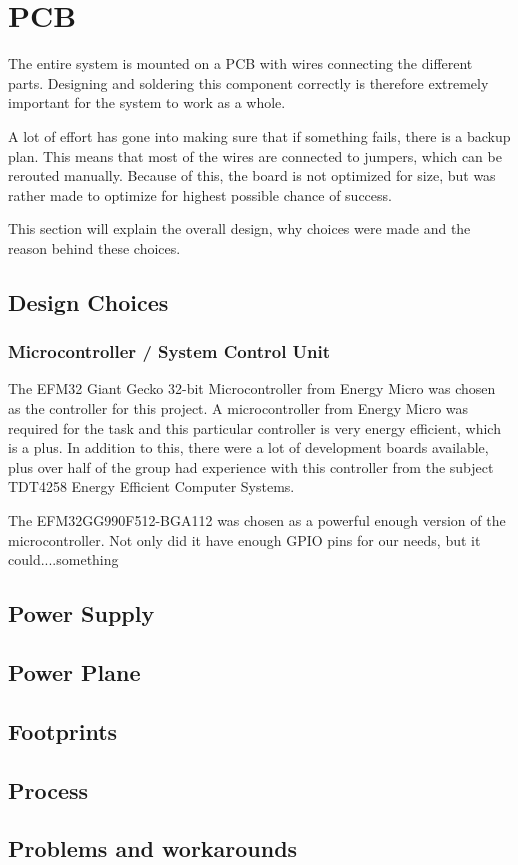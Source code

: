 \section{PCB}
\label{sec:pcb}

The entire system is mounted on a PCB with wires connecting the different parts.
Designing and soldering this component correctly is therefore extremely important for the system
to work as a whole.

A lot of effort has gone into making sure that if something fails, there is a backup plan.
This means that most of the wires are connected to jumpers, which can be rerouted manually.
Because of this, the board is not optimized for size, but was rather made to optimize for
highest possible chance of success.

This section will explain the overall design, why choices were made and the reason behind these choices.

\subsection{Design Choices}
\label{sec:pcb:design}

\subsubsection{Microcontroller / System Control Unit}
The EFM32 Giant Gecko 32-bit Microcontroller from Energy Micro was chosen as the controller for this project.
A microcontroller from Energy Micro was required for the task and this particular controller is
very energy efficient, which is a plus.
In addition to this, there were a lot of development boards available,
plus over half of the group had experience with this controller from the subject
TDT4258 Energy Efficient Computer Systems.

The EFM32GG990F512-BGA112 was chosen as a powerful enough version of the microcontroller.
Not only did it have enough GPIO pins for our needs, but it could....something %

\subsection{Power Supply}

\subsection{Power Plane}

\subsection{Footprints}

\subsection{Process}

\subsection{Problems and workarounds}
